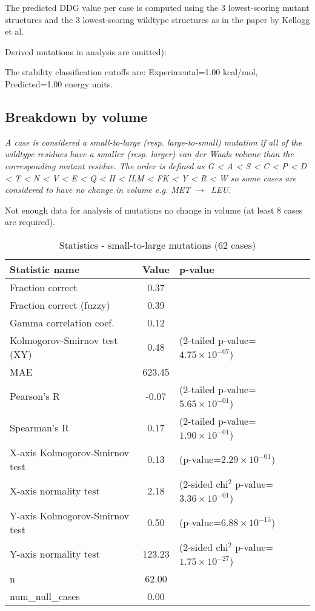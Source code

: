 \documentclass[10pt, letterpaper, oneside, titlepage, landscape]{scrreprt}
\begin{document}
The predicted DDG value per case is computed using the 3 lowest-scoring mutant structures and the 3 lowest-scoring wildtype structures as in the paper by Kellogg et al.

Derived mutations in analysis are omitted):

The stability classification cutoffs are: Experimental=1.00 kcal/mol, Predicted=1.00 energy units.
\subsection{Breakdown by volume}
\textit{A case is considered a small-to-large (resp. large-to-small) mutation if all of the wildtype residues have a smaller (resp. larger) van der Waals volume than the corresponding mutant residue. The order is defined as G < A < S < C < P < D < T < N < V < E < Q < H < ILM < FK < Y < R < W so some cases are considered to have no change in volume e.g. MET $\rightarrow$\ LEU.}

Not enough data for analysis of mutations no change in volume (at least 8 cases are required).


\begin{table}[H]\begin{center}
\begin{tabular}{ l S[table-format=3.2] l}
Statistic name & {Value} & p-value\\
\hline
Fraction correct & 0.37 & \\
Fraction correct (fuzzy) & 0.39 & \\
Gamma correlation coef. & 0.12 & \\
Kolmogorov-Smirnov test (XY) & 0.48 & (2-tailed p-value=$4.75\times10^{-07}$)\\
MAE & 623.45 & \\
Pearson's R & -0.07 & (2-tailed p-value=$5.65\times10^{-01}$)\\
Spearman's R & 0.17 & (2-tailed p-value=$1.90\times10^{-01}$)\\
X-axis Kolmogorov-Smirnov test & 0.13 & (p-value=$2.29\times10^{-01}$)\\
X-axis normality test & 2.18 & (2-sided chi$^{2}$ p-value=$3.36\times10^{-01}$)\\
Y-axis Kolmogorov-Smirnov test & 0.50 & (p-value=$6.88\times10^{-15}$)\\
Y-axis normality test & 123.23 & (2-sided chi$^{2}$ p-value=$1.75\times10^{-27}$)\\
n & 62.00 & \\
num\_null\_cases & 0.00 & \\
\end{tabular}
\caption{Statistics - small-to-large mutations (62 cases)}
\end{center}\end{table}
\end{document}
